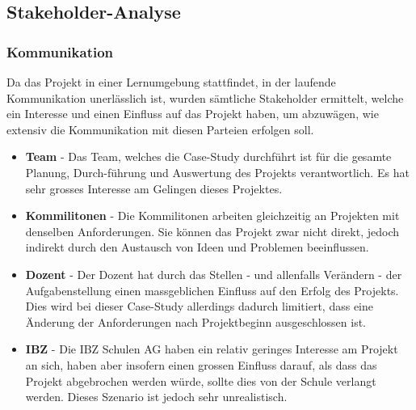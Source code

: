 \subsection{Stakeholder-Analyse}
\subsubsection*{Kommunikation}
Da das Projekt in einer Lernumgebung stattfindet, in der laufende Kommunikation unerlässlich ist, wurden sämtliche Stakeholder ermittelt, welche ein Interesse und einen Einfluss auf das Projekt haben, um abzuwägen, wie extensiv die Kommunikation mit diesen Parteien erfolgen soll.

\begin{itemize}
  \item \textbf{Team} - Das Team, welches die Case-Study durchführt ist für die gesamte Planung, Durch-führung und Auswertung des Projekts verantwortlich. Es hat sehr grosses Interesse am Gelingen dieses Projektes.
  \item \textbf{Kommilitonen} - Die Kommilitonen arbeiten gleichzeitig an Projekten mit denselben Anforderungen. Sie können das Projekt zwar nicht direkt, jedoch indirekt durch den Austausch von Ideen und Problemen beeinflussen.
  \item \textbf{Dozent} - Der Dozent hat durch das Stellen - und allenfalls Verändern - der Aufgabenstellung einen massgeblichen Einfluss auf den Erfolg des Projekts. Dies wird bei dieser Case-Study allerdings dadurch limitiert, dass eine Änderung der Anforderungen nach Projektbeginn ausgeschlossen ist.
  \item \textbf{IBZ} - Die IBZ Schulen AG haben ein relativ geringes Interesse am Projekt an sich, haben aber insofern einen grossen Einfluss darauf, als dass das Projekt abgebrochen werden würde, sollte dies von der Schule verlangt werden. Dieses Szenario ist jedoch sehr unrealistisch.
\end{itemize}



